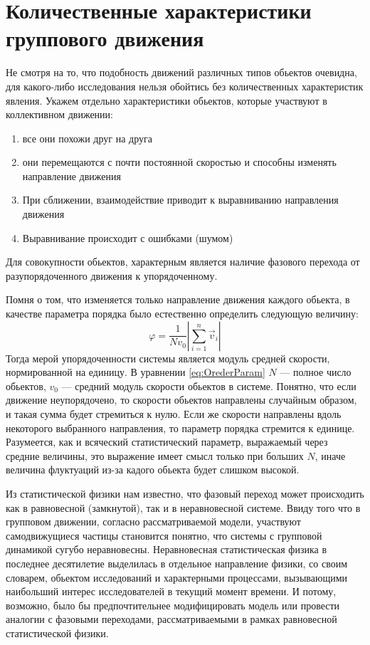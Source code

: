 \section{Количественные характеристики группового движения} %
\label{sec:NumericalCharacteristicsCollMot}
    Не смотря на то, что подобность движений различных типов обьектов очевидна, для какого-либо исследования нельзя обойтись без количественных характеристик явления.
    Укажем отдельно характеристики обьектов, которые участвуют в коллективном движении:
    \begin{enumerate}
        \item все они похожи друг на друга
        \item они перемещаются с почти постоянной скоростью и способны изменять направление движения
        \item При сближении, взаимодействие приводит к выравниванию направления движения
        \item Выравнивание происходит с ошибками (шумом)
    \end{enumerate}

    Для совокупности обьектов, характерным является наличие фазового перехода от разупорядоченного движения к упорядоченному.

    Помня о том, что изменяется только направление движения каждого обьекта, в качестве параметра порядка было естественно определить следующую величину:
    \begin{equation}\label{eq:OrederParam}
        \varphi = \frac{1}{N v_0} |{\sum\limits_{i=1}^n \vec{v}_i}|
    \end{equation}
    Тогда мерой упорядоченности системы является модуль средней скорости, нормированной на единицу. В уравнении \ref{eq:OrederParam} $N$ --- полное число обьектов, $v_0$ --- средний модуль скорости обьектов в системе. Понятно, что если движение неупорядочено, то скорости обьектов направлены случайным образом, и такая сумма будет стремиться к нулю. Если же скорости направлены вдоль некоторого выбранного направления, то параметр порядка стремится к единице. Разумеется, как и всяческий статистический параметр, выражаемый через средние величины, это выражение имеет смысл только при больших $N$, иначе величина флуктуаций из-за кадого обьекта будет слишком высокой.

    Из статистической физики нам известно, что фазовый переход может происходить как в равновесной (замкнутой), так и в неравновесной системе. Ввиду того что в групповом движении, согласно рассматриваемой модели, участвуют самодвижущиеся частицы становится понятно, что системы с групповой динамикой сугубо неравновесны. Неравновесная статистическая физика в последнее десятилетие выделилась в отдельное направление физики, со своим словарем, обьектом исследований и характерными процессами, вызывающими наибольший интерес исследователей в текущий момент времени. И потому, возможно, было бы предпочтительнее модифицировать модель или провести аналогии с фазовыми переходами, рассматриваемыми в рамках равновесной статистической физики.~\cite{vicsek2012}

